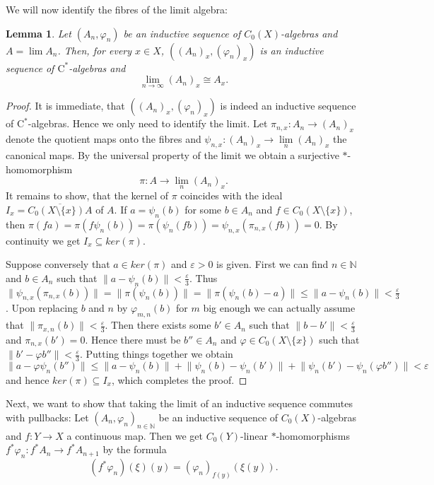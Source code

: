 \documentclass[reqno,oneside,a4paper,11pt]{amsart}
\theoremstyle{theorem}
\newtheorem{lemma}[satz]{Lemma}
\theoremstyle{definition}
\newcommand{\norm}[1]{\lVert#1\rVert}   %
\newcommand{\NN}{\mathbb N}
\begin{document}
	We will now identify the fibres of the limit algebra:
	\begin{lemma}
		Let $(A_n,\varphi_n)$ be an inductive sequence of $C_0(X)$-al\-gebras and $A=\lim A_n$. Then, for every $x\in X$, $((A_n)_x,(\varphi_n)_x)$ is an inductive sequence of $\mathrm{C}^*$-algebras and
		$$ \lim\limits_{n\rightarrow\infty} (A_n)_x\cong A_x.$$
	\end{lemma}
	\begin{proof}
		It is immediate, that $((A_n)_x,(\varphi_n)_x)$ is indeed an inductive sequence of $\mathrm{C}^*$-algebras. Hence we only need to identify the limit.
		Let $\pi_{n,x}:A_n\rightarrow (A_n)_x$ denote the quotient maps onto the fibres and $\psi_{n,x}:(A_n)_x\rightarrow \lim\limits_{n}(A_n)_x$ the canonical maps. By the universal property of the limit we obtain a surjective $*$-homo\-morphism $$\pi:A\rightarrow \lim\limits_{n}(A_n)_x.$$
		It remains to show, that the kernel of $\pi$ coincides with the ideal $I_x=\overline{C_0(X\setminus\lbrace x\rbrace)A}$ of $A$.
		If $a=\psi_n(b)$ for some $b\in A_n$ and $f\in C_0(X\setminus\lbrace x\rbrace)$, then $\pi(fa)=\pi(f\psi_n(b))=\pi(\psi_n(fb))=\psi_{n,x}(\pi_{n,x}(fb))=0$. By continuity we get $I_x\subseteq ker(\pi)$.
		
		Suppose conversely that $a\in ker(\pi)$ and $\varepsilon>0$ is given. First we can find $n\in\NN$ and $b\in A_n$ such that $\norm{a-\psi_n(b)}<\frac{\varepsilon}{3}$. Thus
		$\norm{\psi_{n,x}(\pi_{n,x}(b))}=\norm{\pi(\psi_n(b))}=\norm{\pi(\psi_n(b)-a)}\leq \norm{a-\psi_n(b)}<\frac{\varepsilon}{3}$.
		Upon replacing $b$ and $n$ by $\varphi_{m,n}(b)$ for $m$ big enough we can actually assume that $\norm{\pi_{x,n}(b)}<\frac{\varepsilon}{3}$. Then there exists some $b'\in A_n$ such that $\norm{b-b'}<\frac{\varepsilon}{3}$ and $\pi_{n,x}(b')=0$. Hence there must be $b''\in A_n$ and $\varphi\in C_0(X\setminus\lbrace x\rbrace)$ such that $\norm{b'-\varphi b''}<\frac{\varepsilon}{3}$.
		Putting things together we obtain
		$$\norm{a-\varphi\psi_n(b'')}\leq \norm{ a- \psi_n(b)}+\norm{\psi_n(b)-\psi_n(b')}+\norm{\psi_n(b')-\psi_n(\varphi b'')}<\varepsilon$$
		and hence $ker(\pi)\subseteq I_x$, which completes the proof.
	\end{proof}
	Next, we want to show that taking the limit of an inductive sequence commutes with pullbacks: Let $(A_n,\varphi_n)_{n\in\NN}$ be an inductive sequence of $C_0(X)$-algebras and $f:Y\rightarrow X$ a continuous map. Then we get $C_0(Y)$-linear $*$-homo\-morphisms $f^*\varphi_n:f^*A_n\rightarrow f^* A_{n+1}$ by the formula $$(f^*\varphi_n)(\xi)(y)=(\varphi_n)_{f(y)}(\xi(y)).$$
\end{document}
